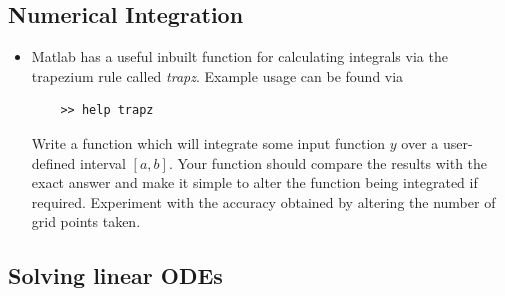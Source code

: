 \documentclass[12pt]{report}
\begin{document}
\subsection*{Numerical Integration}

\begin{itemize}
	\item Matlab has a useful inbuilt function for calculating integrals via the trapezium rule called \textit{trapz}. Example usage can be found via
	\begin{lstlisting}
	>> help trapz
	\end{lstlisting}
	\begin{tcolorbox}[title=Task]
		Write a function which will integrate some input function $y$ over a user-defined interval $[a,b]$. Your function should compare the results with the exact answer and make it simple to alter the function being integrated if required. 
		\tcblower
		Experiment with the accuracy obtained by altering the number of grid points taken.
	\end{tcolorbox}
\end{itemize}

\subsection*{Solving linear ODEs}
\end{document}
